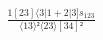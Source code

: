\documentclass[varwidth, border=5pt]{standalone}
\begin{document}
\begin{my}
$\begin{gathered}
\scriptscriptstyle\frac{1[23]⟨3|1+2|3]s_{123}}{⟨13⟩²⟨23⟩[34]²}
\end{gathered}$
\end{my}
\end{document}

